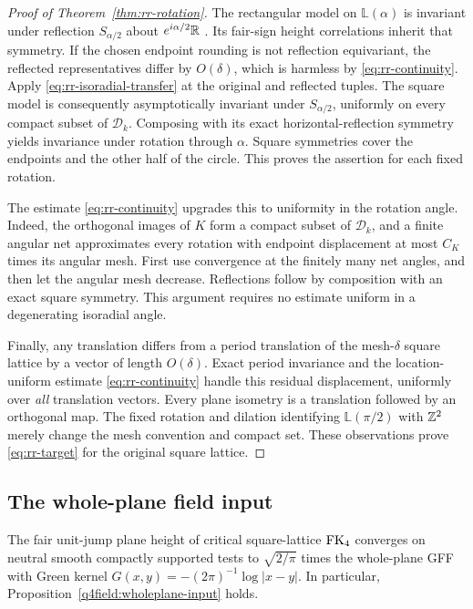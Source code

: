 \begin{proof}[Proof of Theorem~\ref{thm:rr-rotation}]
The rectangular model on $\mathbb L(\alpha)$ is invariant under
reflection $S_{\alpha/2}$ about $e^{i\alpha/2}\mathbb R$
\cite[Remark~1.8]{DCKKMO2026Rotation}.  Its fair-sign height
correlations inherit that symmetry.  If the chosen endpoint
rounding is not reflection equivariant, the reflected
representatives differ by $O(\delta)$, which is harmless by
\eqref{eq:rr-continuity}.  Apply
\eqref{eq:rr-isoradial-transfer} at the original and reflected
tuples.  The square model is consequently asymptotically invariant
under $S_{\alpha/2}$, uniformly on every compact subset of
$\mathcal D_k$.  Composing with its exact horizontal-reflection
symmetry yields invariance under rotation through $\alpha$.
Square symmetries cover the endpoints and the other half of the
circle.  This proves the assertion for each fixed rotation.

The estimate \eqref{eq:rr-continuity} upgrades this to uniformity
in the rotation angle.  Indeed, the orthogonal images of $K$ form
a compact subset of $\mathcal D_k$, and a finite angular net
approximates every rotation with endpoint displacement at most
$C_K$ times its angular mesh.  First use convergence at the
finitely many net angles, and then let the angular mesh decrease.
Reflections follow by composition with an exact square symmetry.
This argument requires no estimate uniform in a degenerating
isoradial angle.

Finally, any translation differs from a period translation of the
mesh-$\delta$ square lattice by a vector of length $O(\delta)$.
Exact period invariance and the location-uniform estimate
\eqref{eq:rr-continuity} handle this residual displacement,
uniformly over \emph{all} translation vectors.  Every plane
isometry is a translation followed by an orthogonal map.
The fixed rotation and dilation identifying
$\mathbb L(\pi/2)$ with $\mathbb Z^2$ merely change the mesh convention
and compact set.  These observations prove
\eqref{eq:rr-target} for the original square lattice.
\end{proof}


\subsection{The whole-plane field input}

\begin{corollary}
\label{cor:rr-gff-input}
The fair unit-jump plane height of critical square-lattice $\operatorname{FK}_4$
converges on neutral smooth compactly supported tests to
$\sqrt{2/\pi}$ times the whole-plane GFF with Green kernel
$G(x,y)=-(2\pi)^{-1}\log|x-y|$.  In particular,
Proposition~\ref{q4field:wholeplane-input} holds.
\end{corollary}

